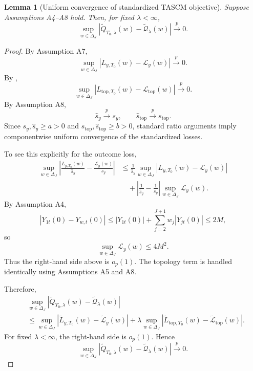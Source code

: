 \documentclass[11pt]{article}
\theoremstyle{plain}
\newtheorem{lemma}[lemma]{Lemma}
\theoremstyle{definition}
\theoremstyle{remark}
\newcommand{\1}{\mathbbm{1}}
\newcommand{\pto}{\xrightarrow{p}}
\begin{document}
\begin{lemma}[Uniform convergence of standardized TASCM objective]
\label{lem:objective-uniform}
Suppose Assumptions A4--A8 hold. Then, for fixed \(\lambda<\infty\),
\[
\sup_{w\in\Delta_J}
\left|
\widetilde Q_{T_0,\lambda}(w)
-
\widetilde{\mathcal Q}_{\lambda}(w)
\right|
\pto 0.
\]
\end{lemma}

\begin{proof}
By Assumption A7,
\[
\sup_{w\in\Delta_J}
|L_{y,T_0}(w)-\mathcal L_y(w)|
\pto 0.
\]
By ,
\[
\sup_{w\in\Delta_J}
|L_{\mathrm{top},T_0}(w)-\mathcal L_{\mathrm{top}}(w)|
\pto 0.
\]
By Assumption A8,
\[
\widehat s_y \pto s_y,
\qquad
\widehat s_{\mathrm{top}}\pto s_{\mathrm{top}}.
\]
Since \(s_y,\widehat s_y\ge a>0\) and
\(s_{\mathrm{top}},\widehat s_{\mathrm{top}}\ge b>0\), standard ratio
arguments imply componentwise uniform convergence of the standardized losses.

To see this explicitly for the outcome loss,
\[
\begin{aligned}
\sup_{w\in\Delta_J}
\left|
\frac{L_{y,T_0}(w)}{\widehat s_y}
-
\frac{\mathcal L_y(w)}{s_y}
\right|
&\le
\frac{1}{\widehat s_y}
\sup_{w\in\Delta_J}
|L_{y,T_0}(w)-\mathcal L_y(w)|
\\
&\quad+
\left|
\frac{1}{\widehat s_y}
-
\frac{1}{s_y}
\right|
\sup_{w\in\Delta_J}\mathcal L_y(w).
\end{aligned}
\]
By Assumption A4,
\[
|Y_{1t}(0)-Y_{w,t}(0)|
\le
|Y_{1t}(0)|
+
\sum_{j=2}^{J+1}w_j|Y_{jt}(0)|
\le
2M,
\]
so
\[
\sup_{w\in\Delta_J}\mathcal L_y(w)\le4M^2.
\]
Thus the right-hand side above is \(o_p(1)\). The topology term is handled
identically using Assumptions A5 and A8.

Therefore,
\[
\begin{aligned}
&
\sup_{w\in\Delta_J}
\left|
\widetilde Q_{T_0,\lambda}(w)
-
\widetilde{\mathcal Q}_{\lambda}(w)
\right|
\\
&\le
\sup_{w\in\Delta_J}
\left|
\widetilde L_{y,T_0}(w)
-
\widetilde{\mathcal L}_y(w)
\right|
+
\lambda
\sup_{w\in\Delta_J}
\left|
\widetilde L_{\mathrm{top},T_0}(w)
-
\widetilde{\mathcal L}_{\mathrm{top}}(w)
\right|.
\end{aligned}
\]
For fixed \(\lambda<\infty\), the right-hand side is \(o_p(1)\). Hence
\[
\sup_{w\in\Delta_J}
\left|
\widetilde Q_{T_0,\lambda}(w)
-
\widetilde{\mathcal Q}_{\lambda}(w)
\right|
\pto 0.
\]
\end{proof}

\end{document}
